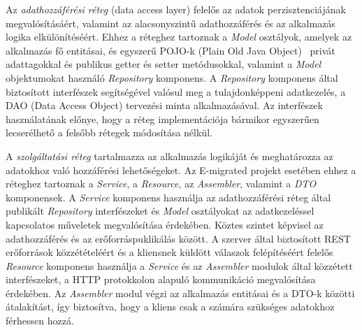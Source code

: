 Az \textit{adathozzáférési réteg} (data access layer) felelős az adatok perzisztenciájának megvalósításáért, valamint az alacsonyszintű adathozzáférés és az alkalmazás logika elkülönítéséért. Ehhez a réteghez tartoznak a \textit{Model} osztályok, amelyek az alkalmazás fő entitásai, és egyszerű POJO-k (Plain Old Java Object)~\cite{POJO} privát adattagokkal és publikus getter és setter metódusokkal, valamint a \textit{Model} objektumokat használó \textit{Repository} komponens. A \textit{Repository} komponens  által biztosított interfészek segítségével valósul meg a tulajdonképpeni adatkezelés, a DAO (Data Access Object)\cite{DAO} tervezési minta alkalmazásával. Az interfészek használatának előnye, hogy a réteg implementációja bármikor egyszerűen lecserélhető a felsőbb rétegek módosítása nélkül. 

A \textit{szolgáltatási réteg} tartalmazza az alkalmazás logikáját és meghatározza az adatokhoz való hozzáférési lehetőségeket. Az E-migrated projekt esetében ehhez a réteghez tartoznak a \textit{Service}, a \textit{Resource}, az \textit{Assembler}, valamint a \textit{DTO} komponensek. A \textit{Service} komponens használja az adathozzáférési réteg által publikált \textit{Repository} interfészeket és \textit{Model} osztályokat az adatkezeléssel kapcsolatos műveletek megvalósítása érdekében. Köztes szintet képvisel az adathozzáférés és az erőforráspuklikálás között. A szerver által biztosított REST erőforrások közzétételéért és a kliensnek küldött válaszok felépítéséért felelős \textit{Resource} komponens használja a  \textit{Service} és az \textit{Assembler} modulok által közzétett interfészeket, a HTTP protokkolon alapuló kommunikáció megvalósítása érdekében. Az \textit{Assembler} modul végzi az alkalmazás entitásai és a DTO-k közötti átalakítást, így biztosítva, hogy a kliens csak a számára szükséges adatokhoz férhessen hozzá. 



